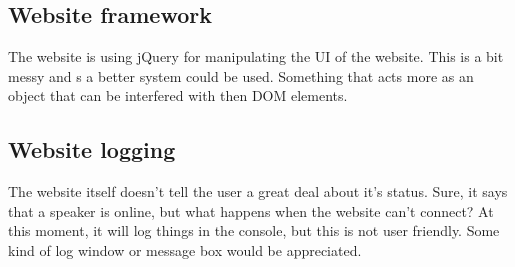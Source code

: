 \subsection{Website framework}
The website is using jQuery for manipulating the UI of the website.
This is a bit messy and s a better system could be used.
Something that acts more as an object that can be interfered with then DOM elements.

\subsection{Website logging}
The website itself doesn't tell the user a great deal about it's status.
Sure, it says that a speaker is online, but what happens when the website can't connect?
At this moment, it will log things in the console, but this is not user friendly.
Some kind of log window or message box would be appreciated.
